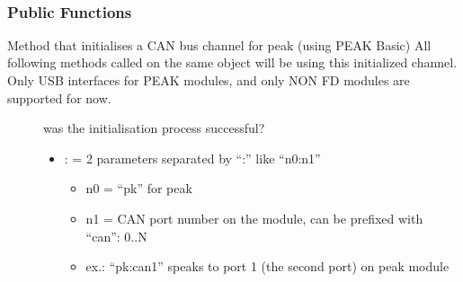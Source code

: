 \documentclass[letterpaper,10pt,english]{sphinxmanual}
\begin{document}
\begin{fulllineitems}
\label{\detokenize{vendors/peak:_CPPv49PKCanScan}}%
\pysigstartmultiline
{}\label{\detokenize{vendors/peak:classPKCanScan}}%
\pysigstopmultiline~\subsubsection*{Public Functions}

\begin{fulllineitems}
\label{\detokenize{vendors/peak:_CPPv4N9PKCanScan9createBusEK6stringK6string}}%
\pysigstartmultiline
{}\label{\detokenize{vendors/peak:classPKCanScan_1ae91999b9316ca127eecbabd9f27c3137}}%
\pysigstopmultiline
Method that initialises a CAN bus channel for peak (using PEAK Basic) All following methods called on the same object will be using this initialized channel. Only USB interfaces for PEAK modules, and only NON FD modules are supported for now.

\begin{description}
\item[{}] \leavevmode
was the initialisation process successful? 

\item[{}] \leavevmode\begin{itemize}
\item {} 
: = 2 parameters separated by “:” like “n0:n1”\begin{itemize}
\item {} 
n0 = “pk” for peak

\item {} 
n1 = CAN port number on the module, can be prefixed with “can”: 0..N

\item {} 
ex.: “pk:can1” speaks to port 1 (the second port) on peak module


\end{itemize}
\end{itemize}
\end{description}
\end{fulllineitems}
\end{fulllineitems}
\end{document}
